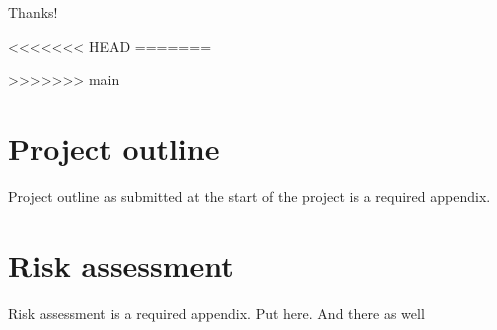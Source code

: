 
\makeatletter
\title{\xmp@Title}
\studentid{\xmp@Author}
\makeatother

\maketitle



\uomtoc


\begin{abstract} %
  This is abstract text.

  \lipsum[1-2]
\end{abstract}%
\clearpage


\uomdeclarations %


\begin{uomacknowledgements}
  Thanks!
\end{uomacknowledgements}






<<<<<<< HEAD
=======

>>>>>>> main

\printbibliography[title={References},heading=bibintoc]


\newpage
\printglossary[type=\acronymtype]

\begin{uomappendix}
    \section{Project outline}
    Project outline as submitted at the start of the project is a required appendix.

    \section{Risk assessment}
    Risk assessment is a required appendix. Put here. And there as well
\end{uomappendix}



